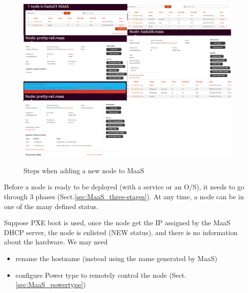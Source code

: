 \begin{figure}[hbt]
  \centerline{\includegraphics[height=9cm,
    angle=0]{./images/Maas_new_node.eps}}
\caption{Steps when adding a new node to MaaS}
\label{fig:Maas_new_node}
\end{figure}

Before a node is ready to be deployed (with a service or an O/S), it needs to go
through 3 phases (Sect.\ref{sec:MaaS_three-stages}). At any time, a node can
be in one of the many defined status.  

Suppose PXE boot is used, once the node get the IP assigned by the MaaS DHCP
server, the node is enlisted (NEW status), and there is no information about the
hardware. We may need
\begin{itemize}
  \item rename the hostname (instead using the name generated by MaaS)
  \item configure Power type to remotely control the node
  (Sect.\ref{sec:MaaS_powertype})
\end{itemize}

